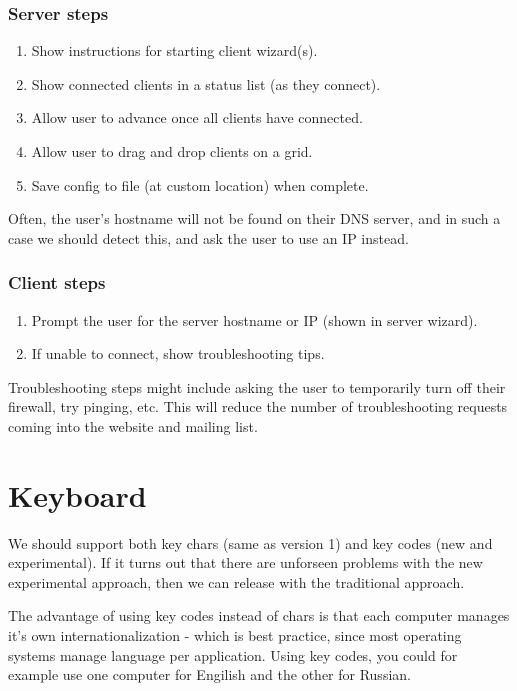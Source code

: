 \subsubsection{Server steps}
\begin{enumerate}
  \item Show instructions for starting client wizard(s).
  \item Show connected clients in a status list (as they connect).
  \item Allow user to advance once all clients have connected.
  \item Allow user to drag and drop clients on a grid.
  \item Save config to file (at custom location) when complete.
\end{enumerate}

Often, the user's hostname will not be found on their DNS server, and in such
a case we should detect this, and ask the user to use an IP instead.

\subsubsection{Client steps}
\begin{enumerate}
  \item Prompt the user for the server hostname or IP (shown in server wizard).
  \item If unable to connect, show troubleshooting tips.
\end{enumerate}

Troubleshooting steps might include asking the user to temporarily turn off
their firewall, try pinging, etc. This will reduce the number of troubleshooting
requests coming into the website and mailing list.

\section{Keyboard}

We should support both key chars (same as version 1) and key codes (new and
experimental). If it turns out that there are unforseen problems with the
new experimental approach, then we can release with the traditional approach.

The advantage of using key codes instead of chars is that each computer manages
it's own internationalization - which is best practice, since most operating
systems manage language per application. Using key codes, you could for example 
use one computer for Engilish and the other for Russian.

